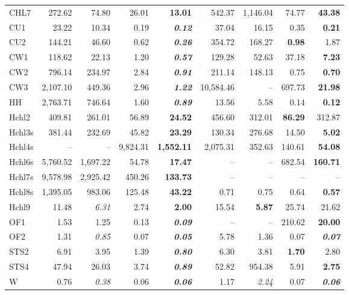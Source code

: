 \documentclass[9pt]{entcs}
\begin{document}
\begin{table}[ht]
\begin{tabular}{@{\extracolsep{4pt}}lrrrrrrrr@{}}
CHL7 & 272.62 & 74.80 & 26.01 & \textbf{13.01} & 542.37 & 1,146.04 & 74.77 & \textbf{43.38} \\
CU1 & 23.22 & 10.34 & 0.19 & \textbf{\textit{0.12}} & 37.04 & 16.15 & 0.35 & \textbf{0.21} \\
CU2 & 144.21 & 46.60 & 0.62 & \textbf{\textit{0.26}} & 354.72 & 168.27 & \textbf{0.98} & 1.87 \\
CW1 & 118.62 & 22.13 & 1.20 & \textbf{\textit{0.57}} & 129.28 & 52.63 & 37.18 & \textbf{7.23} \\
CW2 & 796.14 & 234.97 & 2.84 & \textbf{\textit{0.91}} & 211.14 & 148.13 & 0.75 & \textbf{0.70} \\
CW3 & 2,107.10 & 449.36 & 2.96 & \textbf{\textit{1.22}} & 10,584.46 & -- & 697.73 & \textbf{21.98} \\
HH & 2,763.71 & 746.64 & 1.60 & \textbf{\textit{0.89}} & 13.56 & 5.58 & 0.14 & \textbf{0.12} \\
Hchl2 & 409.81 & 261.01 & 56.89 & \textbf{24.52} & 456.60 & 312.01 & \textbf{86.29} & 312.87 \\
Hchl3s & 381.44 & 232.69 & 45.82 & \textbf{23.29} & 130.34 & 276.68 & 14.50 & \textbf{5.02} \\
Hchl4s & -- & -- & 9,824.31 & \textbf{1,552.11} & 2,075.31 & 352.63 & 140.61 & \textbf{54.08} \\
Hchl6s & 5,760.52 & 1,697.22 & 54.78 & \textbf{17.47} & -- & -- & 682.54 & \textbf{160.71} \\
Hchl7s & 9,578.98 & 2,925.42 & 450.26 & \textbf{133.73} & -- & -- & -- & -- \\
Hchl8s & 1,395.05 & 983.06 & 125.48 & \textbf{43.22} & 0.71 & 0.75 & 0.64 & \textbf{0.57} \\
Hchl9 & 11.48 & \textit{6.31} & 2.74 & \textbf{2.00} & 15.54 & \textbf{5.87} & 25.74 & 21.62 \\
OF1 & 1.53 & 1.25 & 0.13 & \textbf{\textit{0.09}} & -- & -- & 210.62 & \textbf{20.00} \\
OF2 & 1.31 & \textit{0.85} & 0.07 & \textbf{\textit{0.05}} & 5.78 & 1.36 & 0.07 & \textbf{\textit{0.07}} \\
STS2 & 6.91 & 3.95 & 1.39 & \textbf{\textit{0.80}} & 6.30 & 3.81 & \textbf{1.70} & 2.80 \\
STS4 & 47.94 & 26.03 & 3.74 & \textbf{\textit{0.89}} & 52.82 & 954.38 & 5.91 & \textbf{2.75} \\
W & 0.76 & \textit{0.38} & 0.06 & \textbf{\textit{0.06}} & 1.17 & \textit{2.24} & 0.07 & \textbf{\textit{0.06}} \\\hline\hline
\end{tabular}
\label{tab:comparison}
\end{table}
\end{document}

